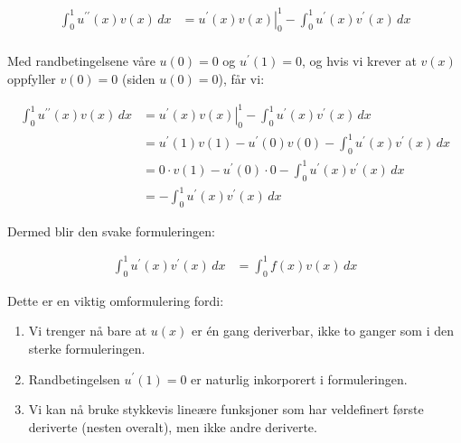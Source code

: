 \begin{align*}
    \int_0^1 u^{\prime\prime}(x) v(x) \, dx & = \left. u^{\prime}(x) v(x) \right|_{0}^{1} - \int_0^1 u^{\prime}(x) v^{\prime}(x) \, dx \\
\end{align*}

Med randbetingelsene våre $u(0) = 0$ og $u^{\prime}(1) = 0$, og hvis vi krever at $v(x)$ oppfyller $v(0) = 0$ (siden $u(0) = 0$), får vi:

\begin{align*}
    \int_0^1 u^{\prime\prime}(x) v(x) \, dx & = \left. u^{\prime}(x) v(x) \right|_{0}^{1} - \int_0^1 u^{\prime}(x) v^{\prime}(x) \, dx \\
                                            & = u^{\prime}(1) v(1) - u^{\prime}(0) v(0) - \int_0^1 u^{\prime}(x) v^{\prime}(x) \, dx   \\
                                            & = 0 \cdot v(1) - u^{\prime}(0) \cdot 0 - \int_0^1 u^{\prime}(x) v^{\prime}(x) \, dx      \\
                                            & = - \int_0^1 u^{\prime}(x) v^{\prime}(x) \, dx
\end{align*}

Dermed blir den svake formuleringen:

\begin{align*}
    \int_0^1 u^{\prime}(x) v^{\prime}(x) \, dx & = \int_0^1 f(x) v(x) \, dx
\end{align*}

Dette er en viktig omformulering fordi:

\begin{enumerate}
    \item Vi trenger nå bare at $u(x)$ er én gang deriverbar, ikke to ganger som i den sterke formuleringen.
    \item Randbetingelsen $u^{\prime}(1) = 0$ er naturlig inkorporert i formuleringen.
    \item Vi kan nå bruke stykkevis lineære funksjoner som har veldefinert første deriverte (nesten overalt), men ikke andre deriverte.
\end{enumerate}

